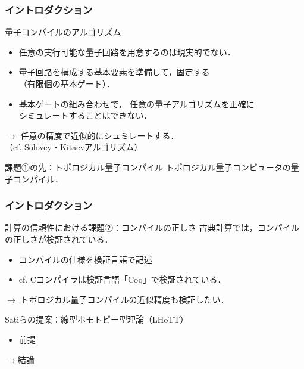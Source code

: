 \documentclass{beamer} %
\theoremstyle{example}
\begin{document}
\begin{frame}
  \frametitle{イントロダクション}
  \begin{block}{量子コンパイルのアルゴリズム}
    \begin{itemize}
      \item 任意の実行可能な量子回路を用意するのは現実的でない．
      \item 量子回路を構成する基本要素を準備して，固定する\\
            （有限個の\alert{基本ゲート}）．
      \item 基本ゲートの組み合わせで，
            任意の量子アルゴリズムを正確に\\
            シミュレートすることはできない．
    \end{itemize}
    \begin{center}
      \(\longrightarrow\)
      任意の精度で\alert{近似的に}シュミレートする．\\
      （cf. Solovey・Kitaevアルゴリズム）
    \end{center}
  \end{block}

  \begin{block}{課題①の先：トポロジカル量子コンパイル}
    トポロジカル量子コンピュータの量子コンパイル．
  \end{block}
\end{frame}

\begin{frame}
  \frametitle{イントロダクション}
  \begin{alertblock}{計算の信頼性における課題②：コンパイルの正しさ}
    古典計算では，コンパイルの正しさが検証されている．
    \begin{itemize}
      \item コンパイルの仕様を検証言語で記述
      \item cf. Cコンパイラは検証言語「Coq」で検証されている．
    \end{itemize}
    \begin{center}
      \(\longrightarrow\)
      トポロジカル量子コンパイルの近似精度も検証したい．
    \end{center}
  \end{alertblock}

  \begin{block}{Satiらの提案：線型ホモトピー型理論（LHoTT）}
    \begin{itemize}
      \item 前提
    \end{itemize}
    \begin{center}
      \(\longrightarrow\)結論
    \end{center}
  \end{block}
\end{frame}
\end{document}
